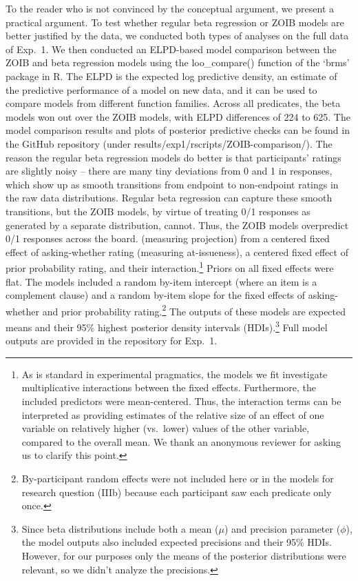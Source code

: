 \documentclass[11pt,fleqn]{article}
\newcommand{\6}{\mbox{$[\hspace*{-.6mm}[$}}
\newcommand{\9}{\mbox{$]\hspace*{-.6mm}]$}}
\begin{document}
{To the reader who is not convinced by the conceptual argument, we present a practical argument. To test whether regular beta regression or ZOIB models are better justified by the data, we conducted both types of analyses on the full data of Exp.~1. We then conducted an ELPD-based model comparison between the ZOIB and beta regression models using the loo\_compare() function of the `brms' package in R. The ELPD is the expected log predictive density, an estimate of the predictive performance of a model on new data, and it can be used to compare models from different function families. Across all predicates, the beta models won out over the ZOIB models, with ELPD differences of 224 to 625. The model comparison results and plots of posterior predictive checks can be found in the GitHub repository (under results/exp1/rscripts/ZOIB-comparison/). The reason the regular beta regression models do better is that participants' ratings are slightly noisy -- there are many tiny deviations from 0 and 1 in responses, which show up as smooth transitions from endpoint to non-endpoint ratings in the raw data distributions. Regular beta regression can capture these smooth transitions, but the ZOIB models, by virtue of treating 0/1 responses as generated by a separate distribution, cannot. Thus, the ZOIB models overpredict 0/1 responses across the board.} (measuring projection) from a centered fixed effect of asking-whether rating (measuring at-issueness), a centered fixed effect of prior probability rating, and their interaction.\footnote{\label{interaction}As is standard in experimental pragmatics, the models we fit investigate multiplicative interactions between the fixed effects.  Furthermore, the included predictors were mean-centered. Thus, the interaction terms can be interpreted as providing estimates of the relative size of an effect of one variable on relatively higher (vs.~lower) values of the other variable, compared to the overall mean. We thank an anonymous reviewer for asking us to clarify this point.} Priors on all fixed effects were flat.  The models included a random by-item intercept (where an item is a complement clause) and a random by-item slope for the fixed effects of asking-whether and prior probability rating.\footnote{By-participant random effects were not included here or in the models for research question (IIIb) because each participant saw each predicate only once.} The outputs of these models are expected means and their 95\% highest posterior density intervals (HDIs).\footnote{Since beta distributions include both a mean  ($\mu$) and precision parameter  ($\phi$), the model outputs also included expected precisions and their 95\% HDIs. However, for our purposes only  the means of the posterior distributions were relevant, so we didn't analyze the precisions.} Full model outputs are provided in the repository for Exp.~1.
\end{document}
